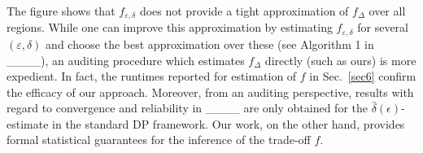 The figure shows that $f_{\varepsilon,\delta}$ does not provide a tight approximation of $f_{\Delta}$ over all regions. 
While one can improve this approximation by estimating $f_{\varepsilon,\delta}$ for several $(\varepsilon, \delta)$ and choose the best approximation over these (see Algorithm 1 in ____), %
an auditing procedure which estimates $f_{\Delta}$ directly (such as ours) is more expedient. 
In fact, the runtimes reported for estimation of $f$ in Sec.~\ref{sec6} confirm the efficacy of our approach. Moreover, from an auditing perspective, results with regard to convergence and reliability in ____ are only obtained for the $\hat{\delta}(\epsilon)$-estimate in the standard DP framework. Our work, on the other hand, provides formal statistical guarantees for the inference of the trade-off $f$.%


